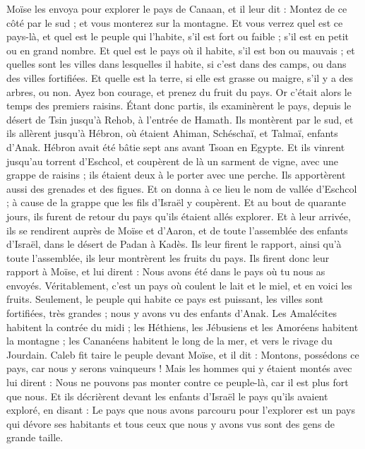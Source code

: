 \begin{multicols}{2}
Moïse les envoya pour explorer le pays de Canaan, et il leur dit : Montez de ce côté par le sud ; et vous monterez sur la montagne.
Et vous verrez quel est ce pays-là, et quel est le peuple qui l'habite, s'il est fort ou faible ; s'il est en petit ou en grand nombre.
Et quel est le pays où il habite, s'il est bon ou mauvais ; et quelles sont les villes dans lesquelles il habite, si c'est dans des camps, ou dans des villes fortifiées.
Et quelle est la terre, si elle est grasse ou maigre, s'il y a des arbres, ou non. Ayez bon courage, et prenez du fruit du pays. Or c'était alors le temps des premiers raisins.
Étant donc partis, ils examinèrent le pays, depuis le désert de Tsin jusqu'à Rehob, à l'entrée de Hamath.
Ils montèrent par le sud, et ils allèrent jusqu'à Hébron, où étaient Ahiman, Schéschaï, et Talmaï, enfants d'Anak. Hébron avait été bâtie sept ans avant Tsoan en Egypte.
Et ils vinrent jusqu'au torrent d'Eschcol, et coupèrent de là un sarment de vigne, avec une grappe de raisins ; ils étaient deux à le porter avec une perche. Ils apportèrent aussi des grenades et des figues.
Et on donna à ce lieu le nom de vallée d'Eschcol ; à cause de la grappe que les fils d'Israël y coupèrent.
Et au bout de quarante jours, ils furent de retour du pays qu'ils étaient allés explorer.
Et à leur arrivée, ils se rendirent auprès de Moïse et d'Aaron, et de toute l'assemblée des enfants d'Israël, dans le désert de Padan à Kadès. Ils leur firent le rapport, ainsi qu'à toute l'assemblée, ils leur montrèrent les fruits du pays.
Ils firent donc leur rapport à Moïse, et lui dirent : Nous avons été dans le pays où tu nous as envoyés. Véritablement, c'est un pays où coulent le lait et le miel, et en voici les fruits.
Seulement, le peuple qui habite ce pays est puissant, les villes sont fortifiées, très grandes ; nous y avons vu des enfants d'Anak.
Les Amalécites habitent la contrée du midi ; les Héthiens, les Jébusiens et les Amoréens habitent la montagne ; les Cananéens habitent le long de la mer, et vers le rivage du Jourdain.
Caleb fit taire le peuple devant Moïse, et il dit : Montons, possédons ce pays, car nous y serons vainqueurs !
Mais les hommes qui y étaient montés avec lui dirent : Nous ne pouvons pas monter contre ce peuple-là, car il est plus fort que nous.
Et ils décrièrent devant les enfants d'Israël le pays qu'ils avaient exploré, en disant : Le pays que nous avons parcouru pour l'explorer est un pays qui dévore ses habitants et tous ceux que nous y avons vus sont des gens de grande taille.

\end{multicols}
